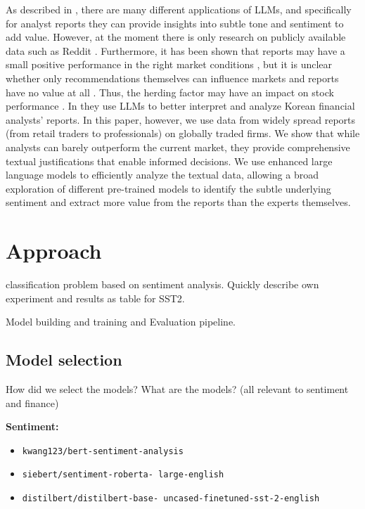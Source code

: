 \documentclass[conference]{IEEEtran}
\begin{document}
As described in \cite{Zhao2024}, there are many different applications of LLMs, and specifically for analyst reports they can provide insights into subtle tone and sentiment to add value. However, at the moment there is only research on publicly available data such as Reddit \cite{Deng2023}. Furthermore, it has been shown that reports may have a small positive performance in the right market conditions \cite{Su2020}, but it is unclear whether only recommendations themselves can influence markets \cite{Brauer2018} and reports have no value at all \cite{Panchenko2007}. Thus, the herding factor may have an impact on stock performance \cite{Palmer2018}.
In \cite{Kim2023} they use LLMs to better interpret and analyze Korean financial analysts' reports.
In this paper, however, we use data from widely spread reports (from retail traders to professionals) on globally traded firms. We show that while analysts can barely outperform the current market, they provide comprehensive textual justifications that enable informed decisions. We use enhanced large language models to efficiently analyze the textual data, allowing a broad exploration of different pre-trained models to identify the subtle underlying sentiment and extract more value from the reports than the experts themselves.


\section{Approach}%
classification problem based on sentiment analysis. 
Quickly describe own experiment and results as table for SST2.

Model building and training and Evaluation pipeline.


\subsection{Model selection}%
How did we select the models? What are the models?
(all relevant to sentiment and finance)

\noindent
\textbf{Sentiment:}
\begin{itemize}
\item \texttt{kwang123/bert-sentiment-analysis}
\item \texttt{siebert/sentiment-roberta- large-english}
\item \texttt{distilbert/distilbert-base- uncased-finetuned-sst-2-english}
\end{itemize}
\end{document}
